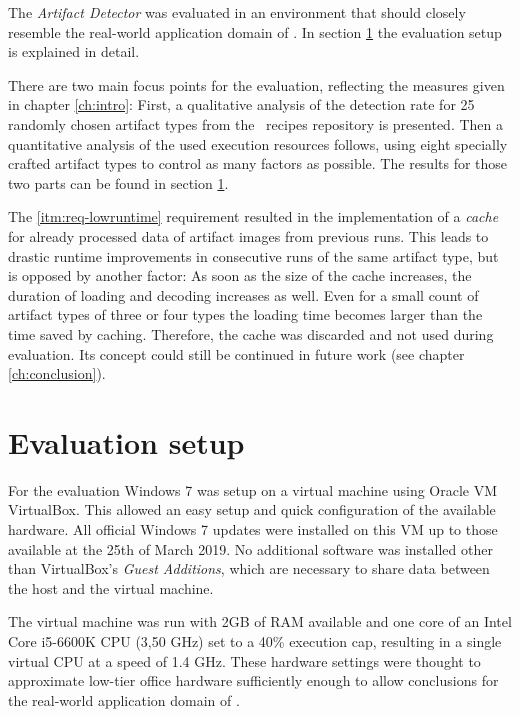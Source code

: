 The \emph{Artifact Detector} was evaluated in an environment that should closely resemble the real-world application domain of \ape. In section \ref{sec:eval-env} the evaluation setup is explained in detail.

There are two main focus points for the evaluation, reflecting the measures given in chapter \ref{ch:intro}: First, a qualitative analysis of the detection rate for 25 randomly chosen artifact types from the \ape~recipes repository is presented. Then a quantitative analysis of the used execution resources follows, using eight specially crafted artifact types to control as many factors as possible. The results for those two parts can be found in section \ref{sec:eval-env}.

The \ref{itm:req-lowruntime} requirement resulted in the implementation of a \emph{cache} for already processed data of artifact images from previous runs. This leads to drastic runtime improvements in consecutive runs of the same artifact type, but is opposed by another factor: As soon as the size of the cache increases, the duration of loading and decoding increases as well. Even for a small count of artifact types of three or four types the loading time becomes larger than the time saved by caching. Therefore, the cache was discarded and not used during evaluation. Its concept could still be continued in future work (see chapter \ref{ch:conclusion}).

\section{Evaluation setup}\label{sec:eval-env}

For the evaluation Windows 7 was setup on a virtual machine using Oracle VM VirtualBox\cite{virtualbox}. This allowed an easy setup and quick configuration of the available hardware. All official Windows 7 updates were installed on this VM up to those available at the 25th of March 2019. No additional software was installed other than VirtualBox's \emph{Guest Additions}, which are necessary to share data between the host and the virtual machine.

The virtual machine was run with 2GB of RAM available and one core of an Intel Core i5-6600K CPU (3,50 GHz) set to a 40\% execution cap, resulting in a single virtual CPU at a speed of 1.4 GHz. These hardware settings were thought to approximate low-tier office hardware sufficiently enough to allow conclusions for the real-world application domain of \ape.

